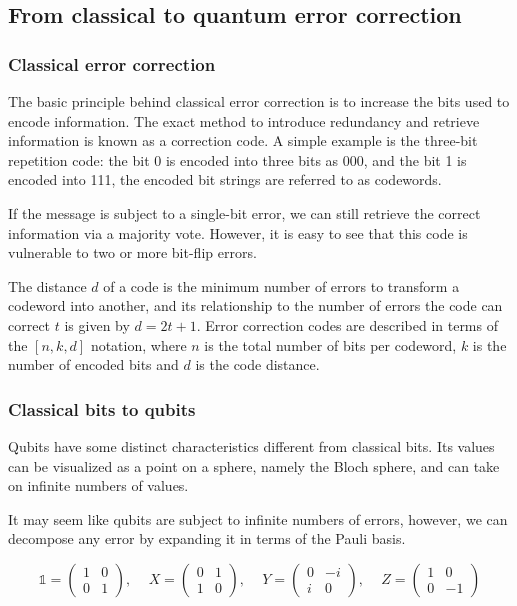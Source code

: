 \documentclass[final,5p,times,twocolumn,authoryear]{elsarticle}
\begin{document}
\subsection{From classical to quantum error correction}

\subsubsection{Classical error correction}

The basic principle behind classical error correction is to increase the bits used to encode information. The exact method to introduce redundancy and retrieve information is known as a correction code. A simple example is the three-bit repetition code: the bit 0 is encoded into three bits as 000, and the bit 1 is encoded into 111, the encoded bit strings are referred to as codewords.

If the message is subject to a single-bit error, we can still retrieve the correct information via a majority vote. However, it is easy to see that this code is vulnerable to two or more bit-flip errors.

The distance $d$ of a code is the minimum number of errors to transform a codeword into another, and its relationship to the number of errors the code can correct $t$ is given by $d=2t+1$. Error correction codes are described in terms of the $[n,k,d]$ notation, where $n$ is the total number of bits per codeword, $k$ is the number of encoded bits and $d$ is the code distance.

\subsubsection{Classical bits to qubits}

Qubits have some distinct characteristics different from classical bits. Its values can be visualized as a point on a sphere, namely the Bloch sphere, and can take on infinite numbers of values.

It may seem like qubits are subject to infinite numbers of errors, however, we can decompose any error by expanding it in terms of the Pauli basis.

\[
    \mathbb{1} =
    \begin{pmatrix}
        1 & 0 \\
        0 & 1
    \end{pmatrix}
    \text{, }
    \quad
    X =
    \begin{pmatrix}
        0 & 1 \\
        1 & 0
    \end{pmatrix}
    \text{, }
    \quad
    Y =
    \begin{pmatrix}
        0 & -i \\
        i & 0
    \end{pmatrix}
    \text{, }
    \quad
    Z =
    \begin{pmatrix}
        1 & 0  \\
        0 & -1
    \end{pmatrix}
\]
\end{document}
